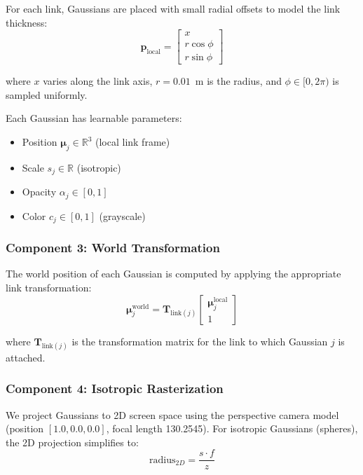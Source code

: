 \documentclass[12pt,a4paper,oneside]{report}
\begin{document}
For each link, Gaussians are placed with small radial offsets to model the link thickness:
\begin{equation}\mathbf{p}_{\text{local}} = \begin{bmatrix} x \\ r \cos\phi \\ r \sin\phi \end{bmatrix}
\end{equation}

where $x$ varies along the link axis, $r = 0.01$~m is the radius, and $\phi \in [0, 2\pi)$ is sampled uniformly.

Each Gaussian has learnable parameters:
\begin{itemize}
    \item Position $\boldsymbol{\mu}_j \in \mathbb{R}^3$ (local link frame)
    \item Scale $s_j \in \mathbb{R}$ (isotropic)
    \item Opacity $\alpha_j \in [0, 1]$
    \item Color $c_j \in [0, 1]$ (grayscale)
\end{itemize}
\subsubsection{Component 3: World Transformation}
\label{subsubsec:component_3_world_transformation}

The world position of each Gaussian is computed by applying the appropriate link transformation:
\begin{equation}\boldsymbol{\mu}_j^{\text{world}} = \mathbf{T}_{\text{link}(j)} \begin{bmatrix} \boldsymbol{\mu}_j^{\text{local}} \\ 1 \end{bmatrix}
\end{equation}

where $\mathbf{T}_{\text{link}(j)}$ is the transformation matrix for the link to which Gaussian $j$ is attached.
\subsubsection{Component 4: Isotropic Rasterization}
\label{subsubsec:component_4_isotropic_rasterization}

We project Gaussians to 2D screen space using the perspective camera model (position $[1.0, 0.0, 0.0]$, focal length 130.2545). For isotropic Gaussians (spheres), the 2D projection simplifies to:
\begin{equation}\text{radius}_{2D} = \frac{s \cdot f}{z}
\end{equation}
\end{document}
